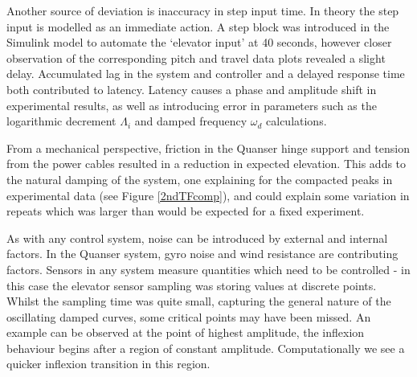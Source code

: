 Another source of deviation is inaccuracy in step input time. In theory
the step input is modelled as an immediate action. A step block was
introduced in the Simulink model to automate the `elevator input' at 40
seconds, however closer observation of the corresponding pitch and
travel data plots revealed a slight delay. Accumulated lag in the system
and controller and a delayed response time both contributed to latency.
Latency causes a phase and amplitude shift in experimental results, as
well as introducing error in parameters such as the logarithmic
decrement \(\Lambda_i\) and damped frequency \(\omega_d\) calculations.

From a mechanical perspective, friction in the Quanser hinge support and
tension from the power cables resulted in a reduction in expected
elevation. This adds to the natural damping of the system, one
explaining for the compacted peaks in experimental data (see Figure
\ref{2ndTFcomp}), and could explain some variation in repeats which was
larger than would be expected for a fixed experiment.

As with any control system, noise can be introduced by external and
internal factors. In the Quanser system, gyro noise and wind resistance
are contributing factors. Sensors in any system measure quantities which
need to be controlled - in this case the elevator sensor sampling was
storing values at discrete points. Whilst the sampling time was quite
small, capturing the general nature of the oscillating damped curves,
some critical points may have been missed. An example can be observed at
the point of highest amplitude, the inflexion behaviour begins after a
region of constant amplitude. Computationally we see a quicker inflexion
transition in this region.
